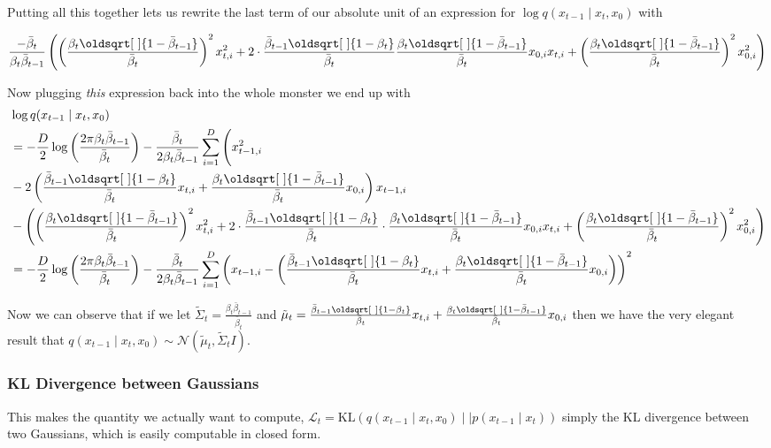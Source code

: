 \documentclass[11pt,dvipsnames]{article}
\renewcommand*{\sqrt}[2][\ ]{\oldsqrt[#1]{#2}}
\begin{document}
Putting all this together lets us rewrite the last term of our absolute unit of an expression for
$\log q(x_{t-1} \mid x_t, x_0)$ with

\begin{equation*}
\frac{-\bar\beta_t}{\beta_t\bar\beta_{t-1}} \left( \left( \frac{\beta_t\sqrt{1 - \bar\beta_{t-1}}}{\bar\beta_t} \right)^2 x_{t,i}^2
+ 2 \cdot \frac{\bar\beta_{t-1}\sqrt{1 - \beta_t}}{\bar\beta_t} \frac{\beta_t\sqrt{1 - \bar\beta_{t-1}}}{\bar\beta_t} x_{0, i} x_{t, i}
+ \left( \frac{\beta_t\sqrt{1 - \bar\beta_{t-1}}}{\bar\beta_t} \right)^2 x_{0,i}^2 \right)
\end{equation*}

Now plugging \emph{this} expression back into the whole monster we end up with
\begin{equation*}
\begin{split}
&\log q(x_{t-1} \mid x_t, x_0) \\
&= -\frac{D}{2}\log\left(\frac{2\pi\beta_t\bar\beta_{t-1}}{\bar\beta_t}\right)
-\frac{\bar\beta_t}{2\beta_t\bar\beta_{t-1}} \sum_{i=1}^D \Bigg( x_{t-1,i}^2 \\
&- 2 \left(\frac{\bar\beta_{t-1}\sqrt{1 - \beta_t}}{\bar\beta_t} x_{t, i} + \frac{\beta_t\sqrt{1 - \bar\beta_{t-1}}}{\bar\beta_t} x_{0, i} \right) x_{t-1, i} \\
&- \left( \left( \frac{\beta_t\sqrt{1 - \bar\beta_{t-1}}}{\bar\beta_t} \right)^2 x_{t,i}^2 
+ 2 \cdot \frac{\bar\beta_{t-1}\sqrt{1 - \beta_t}}{\bar\beta_t} \cdot \frac{\beta_t\sqrt{1 - \bar\beta_{t-1}}}{\bar\beta_t} x_{0, i} x_{t, i}
+ \left( \frac{\beta_t\sqrt{1 - \bar\beta_{t-1}}}{\bar\beta_t} \right)^2 x_{0,i}^2 \right) \\
&= -\frac{D}{2}\log\left(\frac{2\pi\beta_t\bar\beta_{t-1}}{\bar\beta_t}\right)
-\frac{\bar\beta_t}{2\beta_t\bar\beta_{t-1}} \sum_{i=1}^D \left( x_{t-1,i} -  \left(\frac{\bar\beta_{t-1}\sqrt{1 - \beta_t}}{\bar\beta_t} x_{t, i} + \frac{\beta_t\sqrt{1 - \bar\beta_{t-1}}}{\bar\beta_t} x_{0, i} \right) \right)^2
\end{split}
\end{equation*}

Now we can observe that if we let $\tilde\Sigma_t = \frac{\beta_t\bar\beta_{t-1}}{\bar\beta_t}$ and
$\tilde\mu_t = \frac{\bar\beta_{t-1}\sqrt{1 - \beta_t}}{\bar\beta_t} x_{t, i} + \frac{\beta_t\sqrt{1 - \bar\beta_{t-1}}}{\bar\beta_t} x_{0, i}$
then we have the very elegant result that $q(x_{t-1} \mid x_t, x_0) \sim \mathcal{N}(\tilde\mu_t, \tilde\Sigma_t I)$.

\subsubsection{KL Divergence between Gaussians}
This makes the quantity we actually want to compute, $\mathcal{L}_t = \text{KL}\left(q(x_{t-1} \mid x_t, x_0) \mid\mid p(x_{t-1} \mid x_t) \right)$ simply the
KL divergence between two Gaussians, which is easily computable in closed form.
\end{document}
